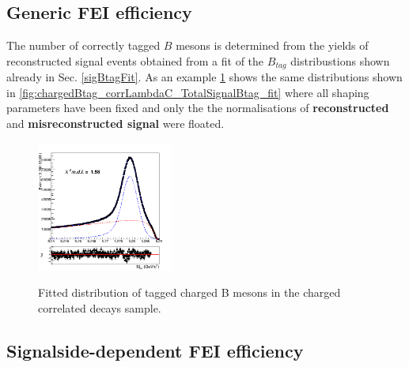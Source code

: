 \subsection{Generic FEI efficiency}

The number of correctly tagged $B$ mesons is determined from the yields of reconstructed signal events obtained from a fit
 of the $B_{tag}$ distribustions shown already in   Sec. \ref{sigBtagFit}. As an example \cref{fig:stream5_chargedBtag_TotalSignal_addedGaussian_Normalisations}
 shows the same distributions shown in \cref{fig:chargedBtag_corrLambdaC_TotalSignalBtag_fit} where all shaping parameters have been 
fixed and only the the normalisations of \textbf{reconstructed}  and \textbf{misreconstructed signal} were floated. \\

 
 \begin{figure}[H]
    \centering
    {\includegraphics[width=0.40\textwidth]{06-Efficiencies/figs/stream5_chargedBtag_TotalSignal_addedGaussian_Normalisations.png}}
    \caption{Fitted distribution of tagged charged B mesons in the charged correlated
    decays sample.}
    \label{fig:stream5_chargedBtag_TotalSignal_addedGaussian_Normalisations}
    \end{figure}

 \subsection{Signalside-dependent FEI efficiency}

